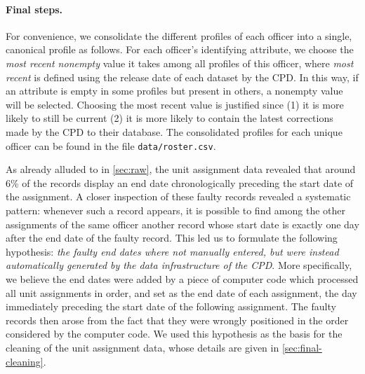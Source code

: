 \paragraph{Final steps.} For convenience, we consolidate the
different profiles of each officer into a single, canonical profile as follows.
For each officer's identifying attribute, we choose the \emph{most recent
nonempty} value it takes among all profiles of this officer, where \emph{most
recent} is defined using the release date of each dataset by the CPD. In this way,
if an attribute is empty in some profiles but present in others, a nonempty value
will be selected. Choosing the most recent value is justified since (1) it is
more likely to still be current (2) it is more likely to contain the latest
corrections made by the CPD to their database. The consolidated profiles
for each unique officer can be found in the file \texttt{data/roster.csv}.

As already alluded to in \cref{sec:raw}, the unit assignment data revealed that
around 6\% of the records display an end date chronologically preceding the
start date of the assignment. A closer inspection of these faulty records
revealed a systematic pattern: whenever such a record appears, it is possible
to find among the other assignments of the same officer another record whose
start date is exactly one day after the end date of the faulty record. This led
us to formulate the following hypothesis: \emph{the faulty end dates where not
manually entered, but were instead automatically generated by the data
infrastructure of the CPD}.  More specifically, we believe the end dates were
added by a piece of computer code which processed all unit assignments in
order, and set as the end date of each assignment, the day immediately
preceding the start date of the following assignment. The faulty records then
arose from the fact that they were wrongly positioned in the order considered
by the computer code. We used this hypothesis as the basis for the cleaning of the unit assignment data, whose details are given in \cref{sec:final-cleaning}.

